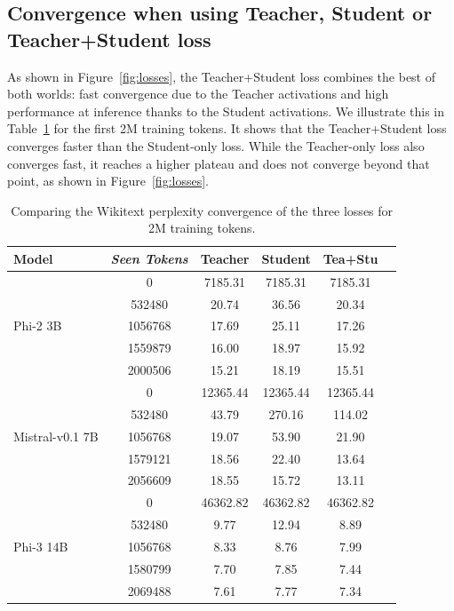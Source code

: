 \documentclass[11pt]{article}
\begin{document}
\subsection{Convergence when using Teacher, Student or Teacher+Student loss}
\label{ssec:logs_loss}

As shown in Figure~\ref{fig:losses}, the Teacher+Student loss combines the best of both worlds: fast convergence due to the Teacher activations and high performance at inference thanks to the Student activations. We illustrate this in Table~\ref{tab:logs} for the first 2M training tokens. It shows that the Teacher+Student loss converges faster than the Student-only loss. While the Teacher-only loss also converges fast, it reaches a higher plateau and does not converge beyond that point, as shown in Figure~\ref{fig:losses}.

\begin{table}[!ht]
    {\scriptsize{
    \begin{tabular}{lccccc}
    \toprule
    \textbf{Model} & \textit{Seen Tokens} & \textbf{Teacher} & \textbf{Student} & \textbf{Tea+Stu} \\ 
    \midrule
    \multirow{5}{*}{Phi-2 3B} 
                              & 0       & 7185.31  & 7185.31  & 7185.31  \\
                              & 532480  & 20.74    & 36.56    & 20.34    \\
                              & 1056768 & 17.69    & 25.11    & 17.26    \\
                              & 1559879 & 16.00    & 18.97    & 15.92    \\
                              & 2000506 & 15.21    & 18.19    & 15.51    \\
    \midrule
    \multirow{5}{*}{Mistral-v0.1 7B} 
                              & 0       & 12365.44 & 12365.44 & 12365.44 \\
                              & 532480  & 43.79    & 270.16   & 114.02   \\
                              & 1056768 & 19.07    & 53.90    & 21.90    \\
                              & 1579121 & 18.56    & 22.40    & 13.64    \\
                              & 2056609 & 18.55    & 15.72    & 13.11    \\
    \midrule
    \multirow{5}{*}{Phi-3 14B} 
                              & 0       & 46362.82 & 46362.82 & 46362.82 \\
                              & 532480  & 9.77     & 12.94    & 8.89     \\
                              & 1056768 & 8.33     & 8.76     & 7.99     \\
                              & 1580799 & 7.70     & 7.85     & 7.44     \\
                              & 2069488 & 7.61     & 7.77      & 7.34     \\
    \bottomrule
    \end{tabular}
    }}
    \caption{Comparing the Wikitext perplexity convergence of the three losses for 2M training tokens.}
    \label{tab:logs}
\end{table}
\end{document}
